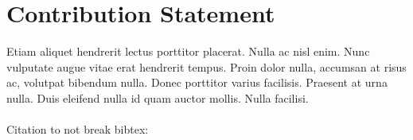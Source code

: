 \documentclass{article}
\theoremstyle{plain}
\theoremstyle{definition}
\theoremstyle{remark}
\begin{document}
\section*{Contribution Statement}

Etiam aliquet hendrerit lectus porttitor placerat. Nulla ac nisl enim. Nunc vulputate augue vitae erat hendrerit tempus. Proin dolor nulla, accumsan at risus ac, volutpat bibendum nulla. Donec porttitor varius facilisis. Praesent at urna nulla. Duis eleifend nulla id quam auctor mollis. Nulla facilisi.\\
\\
Citation to not break bibtex: \citep{mackay2003information}






\end{document}
